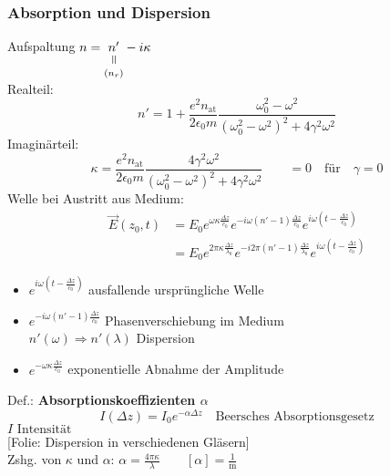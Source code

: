 \documentclass[titlepage,12pt,a4paper,ngerman]{report}
\newcommand{\verteq}{\rotatebox{90}{$\,=$}}
\newcommand{\equalto}[2]{\underset{\scriptstyle\overset{\mkern4mu\verteq}{#2}}{#1}}
\newcommand{\tx}[1]{\textrm{#1}}
\newcommand{\folie}[1]{\color{gray}[Folie: #1]\color{black}}
\begin{document}
\subsubsection{Absorption und Dispersion}
Aufspaltung $ n = \equalto{n'}{(n_r)} - i \kappa $\\
Realteil:
$$n' = 1 + \frac{e^2 n_{\tx{at}}}{2 \epsilon_0 m}\frac{\omega_0^2 - \omega^2}{(\omega_0^2 - \omega^2)^2 + 4 \gamma^2 \omega^2}$$
Imaginärteil:
$$\kappa = \frac{e^2 n_{\tx{at}}}{2 \epsilon_0 m} \frac{4 \gamma ^2 \omega^2}{(\omega_0^2 - \omega^2) ^2 + 4 \gamma^2 \omega^2} \qquad = 0 \quad \tx{für} \quad \gamma = 0 $$
Welle bei Austritt aus Medium:
\begin{align*}
\vec{E}(z_0,t) &= E_0 e^{\omega\kappa \frac{\Delta z}{c_0}} e ^{-i \omega(n'-1) \frac{\Delta z}{c_0}} e^{i\omega (t - \frac{\Delta z}{c_0})}\\
&= E_0 e^{2 \pi \kappa \frac{\Delta z}{\lambda_0}} e ^{-i 2 \pi (n'-1) \frac{\Delta z}{\lambda_0}} e^{i\omega (t - \frac{\Delta z}{c_0})}
\end{align*}
\begin{itemize}
	\item $ e^{i \omega (t - \frac{\Delta z}{c_0})} $ ausfallende ursprüngliche Welle
	\item $ e^{-i \omega(n'-1) \frac{\Delta z}{c_0}} $ Phasenverschiebung im Medium\\
	$ n'(\omega) \Rightarrow n'(\lambda) $ Dispersion
	\item $ e^{-\omega\kappa \frac{\Delta z}{c_0}} $ exponentielle Abnahme der Amplitude
\end{itemize}
Def.: \textbf{Absorptionskoeffizienten $ \alpha $}
$$\boxed{ I (\Delta z) = I_0 e^{- \alpha \Delta z}} \quad \tx{Beersches Absorptionsgesetz}$$
$ I \tx{ Intensität}  $\\
\folie{Dispersion in verschiedenen Gläsern}\\
Zshg. von $ \kappa $ und $ \alpha $: $ \alpha = \frac{ 4 \pi \kappa}{\lambda} \qquad [\alpha] = \frac{1}{\tx{m}}$
\end{document}
